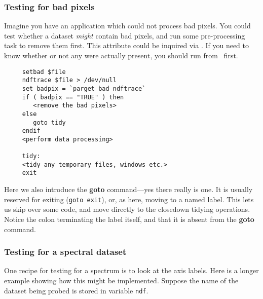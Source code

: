 \subsubsection{Testing for bad pixels
\label{sc4_se_dataset_badpix}}

Imagine you have an application which could not process bad pixels.
You could test whether a dataset {\em might\/} contain bad pixels, and
run some pre-processing task to remove them first.  This attribute
could be inquired via .  If you
need to know whether or not any were actually present, you should run
 from \KAPPAref\ first.

\small
\begin{verbatim}
     setbad $file
     ndftrace $file > /dev/null
     set badpix = `parget bad ndftrace`
     if ( badpix == "TRUE" ) then
        <remove the bad pixels>
     else
        goto tidy
     endif
     <perform data processing>
     
     tidy:
     <tidy any temporary files, windows etc.>
     exit
\end{verbatim}
\normalsize
Here we also introduce the {\bf goto} command---yes there really is
one.  It is usually reserved for exiting ({\tt goto exit}), or, as here,
moving to a named label.  This lets us skip over some code, and move
directly to the closedown tidying operations.  Notice the colon
terminating the label itself, and that it is absent from the {\bf goto}
command.

\newpage
\subsubsection{Testing for a spectral
dataset\label{sc4_se_dataset_spectrum}}

One recipe for testing for a spectrum is to look at the axis labels.
Here is a longer example showing how this might be implemented.
Suppose the name of the dataset being probed is stored in variable
{\tt ndf}.

